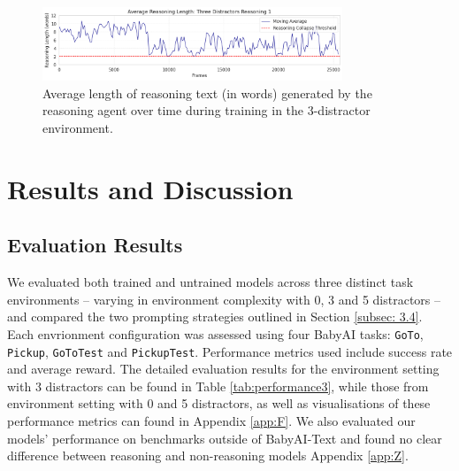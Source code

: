 \documentclass[11pt,a4paper]{article}
\begin{document}
\begin{figure}[t]
    \centering
    \includegraphics[width=0.8\textwidth]{../images/avg_reasoning_length_three_distractors_reasoning_1.png}
    \caption{Average length of reasoning text (in words) generated by the reasoning agent over time during training in the 3-distractor environment.}
    \label{fig:reasoning_length}
\end{figure}

\section{Results and Discussion}
\subsection{Evaluation Results}
We evaluated both trained and untrained models across three distinct task environments -- varying in environment complexity with 0, 3 and 5 distractors -- and compared the two prompting strategies outlined in Section \ref{subsec: 3.4}. Each envrionment configuration was assessed using four BabyAI tasks: \texttt{GoTo}, \texttt{Pickup}, \texttt{GoToTest} and \texttt{PickupTest}. Performance metrics used include success rate and average reward. The detailed evaluation results for the environment setting with 3 distractors can be found in Table \ref{tab:performance3}, while those from environment setting with 0 and 5 distractors, as well as visualisations of these performance metrics can found in Appendix \ref{app:F}. We also evaluated our models' performance on benchmarks outside of BabyAI-Text and found no clear difference between reasoning and non-reasoning models Appendix \ref{app:Z}.
\end{document}
